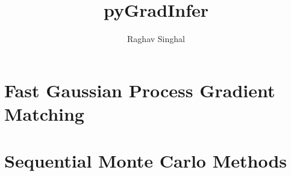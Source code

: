 \documentclass[12pt, letterpaper]{article}
\title{pyGradInfer}
\author{Raghav Singhal}
\begin{document}
\maketitle

\section{Fast Gaussian Process Gradient Matching}

\section{Sequential Monte Carlo Methods}
\end{document}
